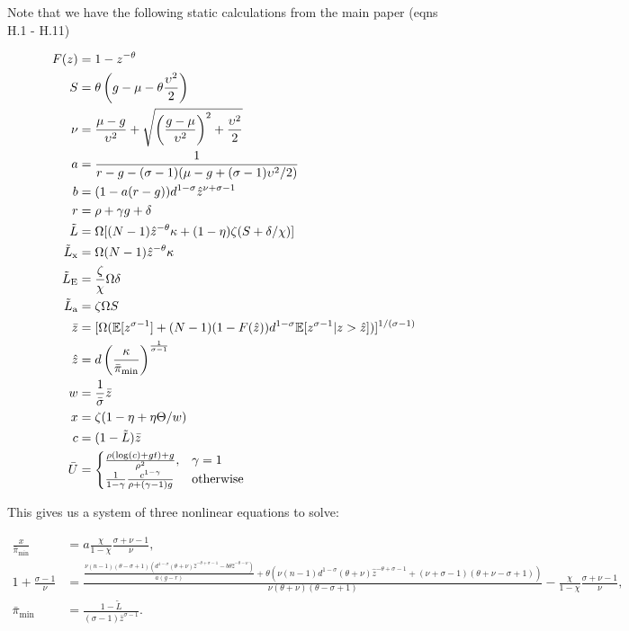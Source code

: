 \documentclass[11pt]{article}
\begin{document}
Note that we have the following static calculations from the main paper (eqns H.1 - H.11)

\begin{align}
	F(z) &= 1 - z^{-\theta} \\
	S &= \theta \left(g - \mu - \theta \frac{\upsilon^2}{2}\right) \\
	\nu &= \frac{\mu - g}{\upsilon^2} + \sqrt{\left(\frac{g - \mu}{\upsilon^2}\right)^2 + \frac{\upsilon^2}{2}} \\
	a &= \frac{1}{r - g - (\sigma - 1)(\mu - g  + (\sigma - 1)\upsilon^2/2)} \\
	b &= (1 - a(r-g))d^{1-\sigma}\hat{z}^{\nu + \sigma -1} \\
	r &= \rho + \gamma g + \delta \\
	\tilde{L} &= \Omega [(N-1)\hat{z}^{-\theta}\kappa + (1-\eta)\zeta(S + \delta/\chi)] \\
	\tilde{L}_{\text{x}} &= \Omega (N -1)\hat{z}^{-\theta}\kappa\\
	\tilde{L}_{\text{E}} &= \frac{\zeta}{\chi}\Omega\delta\\
	\tilde{L}_{\text{a}} &= \zeta \Omega S\\
	\bar{z} &= [\Omega(\mathbb{E}[z^{\sigma - 1}] + (N-1)(1 - F(\hat{z}))d^{1 - \sigma}\mathbb{E}[z^{\sigma - 1}|z > \hat{z}])]^{1/(\sigma - 1)} \\
	\hat{z} &= d \left(\frac{\kappa}{\bar{\pi}_{\textup{min}}}\right)^{\frac{1}{\sigma - 1}} \\
	w &= \frac{1}{\bar{\sigma}}\bar{z} \\
	x &= \zeta(1 - \eta + \eta \Theta / w) \\
		c &= (1 - \tilde{L})\bar{z} \\
		\bar{U} &=
	\begin{cases}
	\frac{\rho (\log(c) + gt ) + g}{\rho^2}, & \gamma = 1 \\
	\frac{1}{1-\gamma} \frac{c^{1 - \gamma}}{\rho + (\gamma - 1)g} & \text{otherwise}
	\end{cases} 
\end{align}

This gives us a system of three nonlinear equations to solve:

		\begin{align}
		\frac{x}{\bar{\pi}_{\min}} &=  a \frac{\chi}{1-\chi}\frac{\sigma + \nu - 1}{\nu} , \\
		1 + \frac{\sigma - 1}{\nu} &= {\scriptstyle \frac{\frac{\nu  (n-1) (\theta -\sigma +1) \left(d^{1-\sigma } (\theta +\nu ) \hat{z}^{-\theta +\sigma -1}-b \theta  \hat{z}^{-\theta -\nu }\right)}{a (g-r)}+\theta  \left(\nu  (n-1) d^{1-\sigma } (\theta +\nu ) \hat{z}^{-\theta +\sigma -1}+(\nu +\sigma -1) (\theta +\nu -\sigma +1)\right)}{\nu  (\theta +\nu ) (\theta -\sigma +1)} -  \frac{\chi}{1-\chi}\frac{\sigma + \nu - 1}{\nu}} , \\
		\bar{\pi}_{\min} &= \tfrac{1 - \tilde{L}}{(\sigma - 1) \bar{z}^{\sigma - 1}}.
		\end{align}
\end{document}
